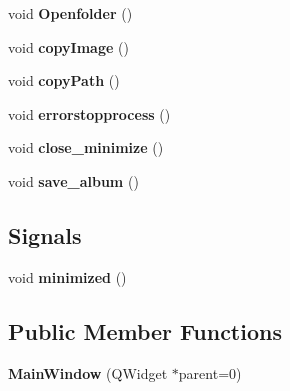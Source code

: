 \begin{DoxyCompactItemize}
\item 
\hypertarget{classMainWindow_a3b43993780b5d104db3472ce7e9180e6}{
void {\bfseries Openfolder} ()}
\label{classMainWindow_a3b43993780b5d104db3472ce7e9180e6}

\item 
\hypertarget{classMainWindow_a0d88444127f5f56a4db14d850938dfb6}{
void {\bfseries copyImage} ()}
\label{classMainWindow_a0d88444127f5f56a4db14d850938dfb6}

\item 
\hypertarget{classMainWindow_a5dfecbc3190aaa5b1d4ff5fe84f8c12b}{
void {\bfseries copyPath} ()}
\label{classMainWindow_a5dfecbc3190aaa5b1d4ff5fe84f8c12b}

\item 
\hypertarget{classMainWindow_a463ad5b4c5ca193c1ba13247bedcfaca}{
void {\bfseries errorstopprocess} ()}
\label{classMainWindow_a463ad5b4c5ca193c1ba13247bedcfaca}

\item 
\hypertarget{classMainWindow_a2f76e8dbbe9eca94d07919786a7c5108}{
void {\bfseries close\_\-minimize} ()}
\label{classMainWindow_a2f76e8dbbe9eca94d07919786a7c5108}

\item 
\hypertarget{classMainWindow_ae50efe3540a13d96ec86c677ad56880c}{
void {\bfseries save\_\-album} ()}
\label{classMainWindow_ae50efe3540a13d96ec86c677ad56880c}

\end{DoxyCompactItemize}
\subsection*{Signals}
\begin{DoxyCompactItemize}
\item 
\hypertarget{classMainWindow_a3b1f97543263266499a860cbb03b71fb}{
void {\bfseries minimized} ()}
\label{classMainWindow_a3b1f97543263266499a860cbb03b71fb}

\end{DoxyCompactItemize}
\subsection*{Public Member Functions}
\begin{DoxyCompactItemize}
\item 
\hypertarget{classMainWindow_a8b244be8b7b7db1b08de2a2acb9409db}{
{\bfseries MainWindow} (QWidget $\ast$parent=0)}
\label{classMainWindow_a8b244be8b7b7db1b08de2a2acb9409db}

\end{DoxyCompactItemize}
